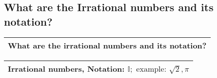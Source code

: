 \subsection{What are the Irrational numbers and its notation?}
\begin{small}
    \begin{tabularx}{1\textwidth}{
            p{}
        }
        \toprule
        What are the irrational numbers and its notation?
        \\
        \bottomrule

    \end{tabularx}
\end{small}
\begin{small}
    \begin{tabularx}{1\textwidth}{
            p{}
        }
        \toprule
        Irrational numbers, Notation: $ \mathbb{I}; \text{ example: } \sqrt{2}, \pi $\\
        \bottomrule

    \end{tabularx}
\end{small}
